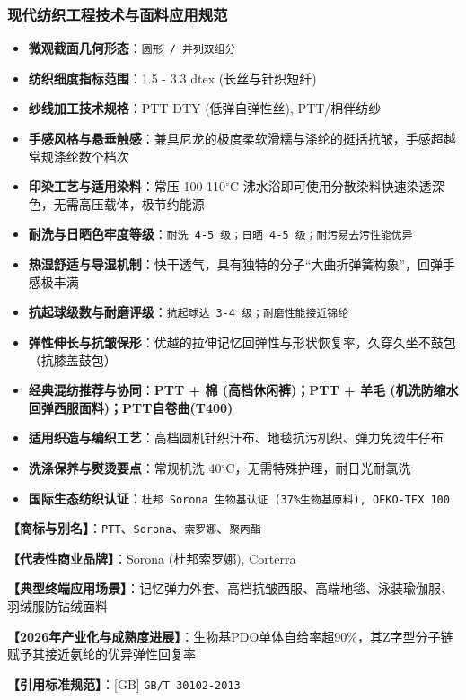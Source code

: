 \documentclass[11pt,openright,twoside,UTF8]{ctexbook}
\begin{document}
\subsubsection*{现代纺织工程技术与面料应用规范}
\begin{itemize} \setlength{\itemsep}{2pt}
    \item \textbf{微观截面几何形态}：\texttt{圆形 / 并列双组分}
    \item \textbf{纺织细度指标范围}：1.5 - 3.3 dtex (长丝与针织短纤)
    \item \textbf{纱线加工技术规格}：PTT DTY (低弹自弹性丝), PTT/棉伴纺纱
    \item \textbf{手感风格与悬垂触感}：兼具尼龙的极度柔软滑糯与涤纶的挺括抗皱，手感超越常规涤纶数个档次
    \item \textbf{印染工艺与适用染料}：常压 100-110$^\circ\mathrm{C}$ 沸水浴即可使用分散染料快速染透深色，无需高压载体，极节约能源
    \item \textbf{耐洗与日晒色牢度等级}：\texttt{耐洗 4-5 级；日晒 4-5 级；耐污易去污性能优异}
    \item \textbf{热湿舒适与导湿机制}：快干透气，具有独特的分子“大曲折弹簧构象”，回弹手感极丰满
    \item \textbf{抗起球级数与耐磨评级}：\texttt{抗起球达 3-4 级；耐磨性能接近锦纶}
    \item \textbf{弹性伸长与抗皱保形}：优越的拉伸记忆回弹性与形状恢复率，久穿久坐不鼓包（抗膝盖鼓包）
    \item \textbf{经典混纺推荐与协同}：\textbf{PTT + 棉 (高档休闲裤)；PTT + 羊毛 (机洗防缩水回弹西服面料)；PTT自卷曲(T400)}
    \item \textbf{适用织造与编织工艺}：高档圆机针织汗布、地毯抗污机织、弹力免烫牛仔布
    \item \textbf{洗涤保养与熨烫要点}：常规机洗 40$^\circ\mathrm{C}$，无需特殊护理，耐日光耐氯洗
    \item \textbf{国际生态纺织认证}：\texttt{杜邦 Sorona 生物基认证 (37\%生物基原料), OEKO-TEX 100}
\end{itemize}
\vspace{0.2cm}

\noindent\textbf{【商标与别名】}：\texttt{PTT}、\texttt{Sorona}、\texttt{索罗娜}、\texttt{聚丙酯}\par
\noindent\textbf{【代表性商业品牌】}：Sorona (杜邦索罗娜), Corterra\par
\noindent\textbf{【典型终端应用场景】}：记忆弹力外套、高档抗皱西服、高端地毯、泳装瑜伽服、羽绒服防钻绒面料\par
\noindent\textbf{【2026年产业化与成熟度进展】}：生物基PDO单体自给率超90\%，其Z字型分子链赋予其接近氨纶的优异弹性回复率\par
\noindent\textbf{【引用标准规范】}：[GB] \texttt{GB/T 30102-2013}\par
\vspace{0.5cm}
\end{document}
